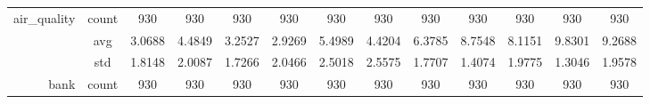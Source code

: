 \begin{table}[htbp]
{\begin{tabular}{rcccccccccccc}
			air\_quality                       & count                                  & 930                                                                                & 930                                                                       & 930                                                                       & 930                                                                       & 930                                           & 930                                         & 930                                            & 930                                            & 930                                            & 930                                            & 930                                            \\
			                                   & avg                                    & 3.0688                                                                             & 4.4849                                                                    & 3.2527                                                                    & \cellcolor[rgb]{ .776,  .937,  .808}\textcolor[rgb]{ 0,  .38,  0}{2.9269} & 5.4989                                        & 4.4204                                      & 6.3785                                         & 8.7548                                         & 8.1151                                         & 9.8301                                         & 9.2688                                         \\
			                                   & std                                    & 1.8148                                                                             & 2.0087                                                                    & 1.7266                                                                    & 2.0466                                                                    & 2.5018                                        & 2.5575                                      & 1.7707                                         & 1.4074                                         & 1.9775                                         & 1.3046                                         & 1.9578                                         \\
			bank                               & count                                  & 930                                                                                & 930                                                                       & 930                                                                       & 930                                                                       & 930                                           & 930                                         & 930                                            & 930                                            & 930                                            & 930                                            & 930                                            \\

\end{tabular}}
\end{table}
